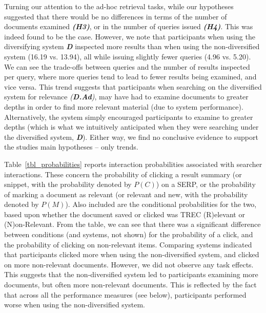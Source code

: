 Turning our attention to the ad-hoc retrieval tasks, while our hypotheses suggested that there would be no differences in terms of the number of documents examined \emph{\textbf{(H3)}}, or in the number of queries issued \emph{\textbf{(H4)}}. This was indeed found to be the case. However, we note that participants when using the diversifying system \textbf{\emph{D}} inspected more results than when using the non-diversified system (16.19 vs. 13.94), all while issuing slightly fewer queries (4.96 vs. 5.20). We can see the trade-offs between queries and the number of results inspected per query, where more queries tend to lead to fewer results being examined, and vice versa. This trend suggests that participants when searching on the diversified system for relevance \emph{(\textbf{D.Ad})}, may have had to examine documents to greater depths in order to find more relevant material (due to system performance). Alternatively, the system simply encouraged participants to examine to greater depths (which is what we intuitively anticipated when they were searching under the diversified system, \textbf{\emph{D}}). Either way, we find no conclusive evidence to support the studies main hypotheses -- only trends. 

Table~\ref{tbl_probabilities} reports interaction probabilities associated with searcher interactions. These concern the probability of clicking a result summary (or snippet, with the probability denoted by $P(C)$) on a SERP, or the probability of marking a document as relevant (or relevant and new, with the probability denoted by $P(M)$). Also included are the conditional probabilities for the two, based upon whether the document saved or clicked was TREC (R)elevant or (N)on-Relevant. From the table, we can see that there was a significant difference between conditions (and systems, not shown) for the probability of a click, and the probability of clicking on non-relevant items. Comparing systems indicated that participants clicked more when using the non-diversified system, and clicked on more non-relevant documents. However, we did not observe any task effects. This suggests that the non-diversified system led to participants examining more documents, but often more non-relevant documents. This is reflected by the fact that across all the performance measures (see below), participants performed worse when using the non-diversified system.

